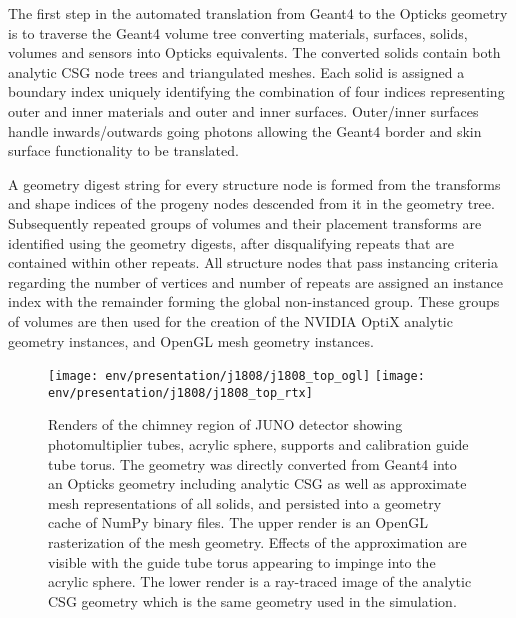 \documentclass{webofc}
\newcommand{\comment}[1]{}
\begin{document}
The first step in the automated translation from Geant4 to the Opticks geometry is to traverse the Geant4 volume tree converting 
materials, surfaces, solids, volumes and sensors into Opticks equivalents. 
The converted solids contain both analytic CSG node trees and triangulated meshes.   
Each solid is assigned a boundary index uniquely identifying the combination of four indices representing 
outer and inner materials and outer and inner surfaces. Outer/inner surfaces handle inwards/outwards going photons allowing the Geant4 border and skin
surface functionality to be translated. 

A geometry digest string for every structure node is formed from the transforms and shape indices of the progeny nodes descended from it in the geometry tree. 
Subsequently repeated groups of volumes and their placement transforms are identified using the geometry digests, after disqualifying repeats
that are contained within other repeats. 
All structure nodes that pass instancing criteria regarding the number of vertices and number of repeats are assigned an instance index
with the remainder forming the global non-instanced group. 
These groups of volumes are then used for the creation of the NVIDIA OptiX analytic geometry instances, and OpenGL mesh geometry instances.  

\comment{
GPUs contain hardware dedicated to fast texture lookup and interpolation.
This is exploited by using a single 2D {\tt float4} texture named the boundary texture
that contains interleaved material and surface properties as a function of wavelength for all
unique boundaries.
The boundary index returned from a ray traced primitive intersection together with
an orientation offset identified from the angle between the geometric normal and ray direction
enables four wavelength interpolated material or surface properties to be
obtained from a single hardware optimized texture lookup.
}
%
%
\begin{figure}
\centering
\texttt{[image: env/presentation/j1808/j1808\_top\_ogl]}
\texttt{[image: env/presentation/j1808/j1808\_top\_rtx]}
\caption{Renders of the chimney region of JUNO detector showing photomultiplier tubes, acrylic sphere, supports and calibration guide tube torus. 
The geometry was directly converted from Geant4 into an Opticks geometry including analytic CSG as well as approximate mesh representations of all solids, 
and persisted into a geometry cache of NumPy\cite{numpy} binary files. 
The upper render is an OpenGL rasterization of the mesh geometry. Effects of the approximation are visible with the guide tube torus appearing to impinge into
the acrylic sphere. The lower render is a ray-traced image of the analytic CSG geometry which is the 
same geometry used in the simulation.}
\label{j1808} 
\end{figure}
%
%
\end{document}

